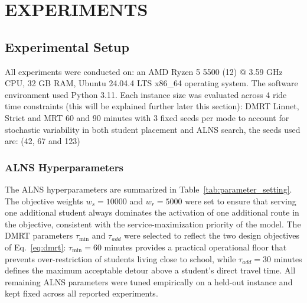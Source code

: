 \documentclass[journal]{IEEEtran}
\begin{document}
\section{EXPERIMENTS}

\subsection{Experimental Setup}

All experiments were conducted on: an AMD Ryzen 5 5500 (12) @ 3.59 GHz CPU, 32 GB RAM,  Ubuntu 24.04.4 LTS x86\_64 operating system. 
The software environment used Python 3.11. Each instance size was evaluated across 4  ride time constraints (this will be explained further later this section): DMRT Linnet, Strict and MRT 60 and 90 minutes with 3 fixed 
seeds per mode to account for stochastic variability in both student 
placement and ALNS search, the seeds used are: (42, 67 and 123)


\subsubsection{ALNS Hyperparameters}

The ALNS hyperparameters are summarized in 
Table~\ref{tab:parameter_setting}. The objective weights 
$w_s = 10000$ and $w_r = 5000$ were set to ensure that serving 
one additional student always dominates the activation of one 
additional route in the objective, consistent with the 
service-maximization priority of the model. The DMRT parameters 
$\tau_{\min}$ and $\tau_{add}$ were selected to reflect the two 
design objectives of Eq.~\ref{eq:dmrt}: $\tau_{\min} = 60$ 
minutes provides a practical operational floor that prevents 
over-restriction of students living close to school, while 
$\tau_{add} = 30$ minutes defines the maximum acceptable 
detour above a student's direct travel time. All remaining ALNS 
parameters were tuned empirically on a held-out instance and kept 
fixed across all reported experiments.
\end{document}
